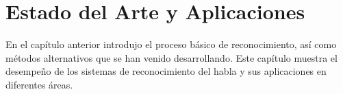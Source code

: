\chapter{Estado del Arte y Aplicaciones}
\label{sec:estado-aplicaciones}

En el cap\'itulo anterior introdujo el proceso b\'asico de reconocimiento, as\'i como m\'etodos
alternativos que se han venido desarrollando. Este cap\'itulo muestra el desempe\~no de los
sistemas de reconocimiento del habla y sus aplicaciones en diferentes \'areas.


